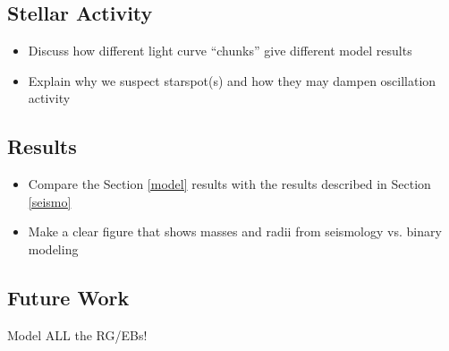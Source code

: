 \subsection{Stellar Activity}
\begin{itemize}
\item Discuss how different light curve ``chunks'' give different model results
\item Explain why we suspect starspot(s) and how they may dampen oscillation activity
\end{itemize}

\subsection{Results}\label{results}
\begin{itemize}
\item Compare the Section \ref{model} results with the \citet{gau14} results described in Section \ref{seismo}
\item Make a clear figure that shows masses and radii from seismology vs. binary modeling
\end{itemize}

\subsection{Future Work}\label{future}
Model ALL the RG/EBs!
